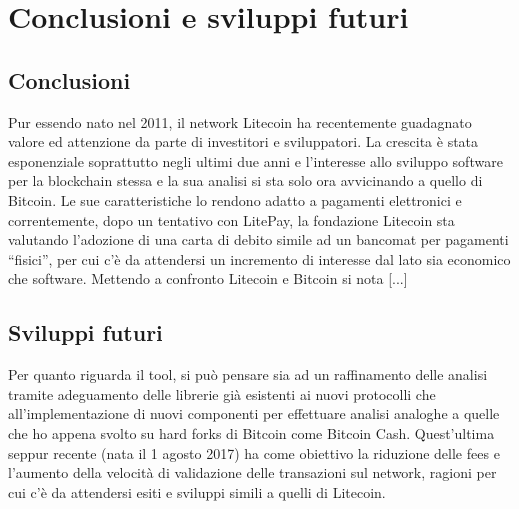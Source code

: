 \chapter{Conclusioni e sviluppi futuri}

\section{Conclusioni}
Pur essendo nato nel 2011, il network Litecoin ha recentemente guadagnato valore ed attenzione da parte di investitori e sviluppatori. La crescita è stata esponenziale soprattutto negli ultimi due anni e l’interesse allo sviluppo software per la blockchain stessa e la sua analisi si sta solo ora avvicinando a quello di Bitcoin. Le sue caratteristiche lo rendono adatto a pagamenti elettronici e correntemente, dopo un tentativo con LitePay, la fondazione Litecoin sta valutando l’adozione di una carta di debito simile ad un bancomat per pagamenti “fisici”, per cui c’è da attendersi un incremento di interesse dal lato sia economico che software.
Mettendo a confronto Litecoin e Bitcoin si nota [...]


\section{Sviluppi futuri}

Per quanto riguarda il tool, si può pensare sia ad un raffinamento delle analisi tramite adeguamento delle librerie già esistenti ai nuovi protocolli che all'implementazione di nuovi componenti per effettuare analisi analoghe a quelle che ho appena svolto su hard forks di Bitcoin come Bitcoin Cash. Quest’ultima seppur recente (nata il 1 agosto 2017) ha come obiettivo la riduzione delle fees e l’aumento della velocità di validazione delle transazioni sul network, ragioni per cui c’è da attendersi esiti e sviluppi simili a quelli di Litecoin.


